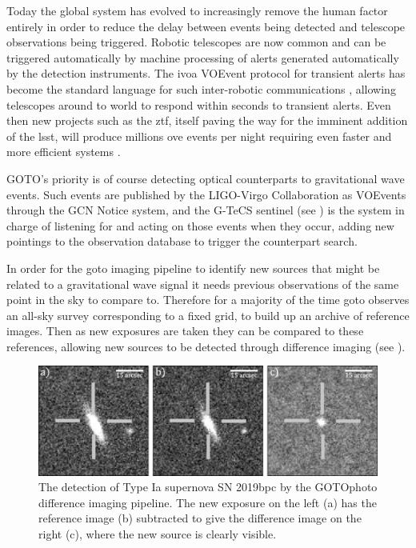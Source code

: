 \begin{colsection}
\begin{colsection}
Today the global system has evolved to increasingly remove the human factor entirely in order to reduce the delay between events being detected and telescope observations being triggered. Robotic telescopes are now common and can be triggered automatically by machine processing of alerts generated automatically by the detection instruments. The \gls{ivoa} VOEvent protocol for transient alerts has become the standard language for such inter-robotic communications \citep{voevent}, allowing telescopes around to world to respond within seconds to transient alerts. Even then new projects such as the \gls{ztf}, itself paving the way for the imminent addition of the \gls{lsst}, will produce millions ove events per night requiring even faster and more efficient systems \citep{ZTF_alerts}.

GOTO's priority is of course detecting optical counterparts to gravitational wave events. Such events are published by the LIGO-Virgo Collaboration as VOEvents through the GCN Notice system, and the G-TeCS sentinel (see ) is the system in charge of listening for and acting on those events when they occur, adding new pointings to the observation database to trigger the counterpart search.

In order for the \gls{goto} imaging pipeline to identify new sources that might be related to a gravitational wave signal it needs previous observations of the same point in the sky to compare to. Therefore for a majority of the time \gls{goto} observes an all-sky survey corresponding to a fixed grid, to build up an archive of reference images. Then as new exposures are taken they can be compared to these references, allowing new sources to be detected through difference imaging (see ).


\begin{figure}[t]
\includegraphics[width=\linewidth]{images/diffimg.pdf}
\caption[The detection of SN 2019bpc through difference imaging]{The detection of Type Ia supernova SN 2019bpc by the GOTOphoto difference imaging pipeline. The new exposure on the left (a) has the reference image (b) subtracted to give the difference image on the right (c), where the new source is clearly visible.}
\label{fig:difference_imaging}
\end{figure}


\end{colsection}


\end{colsection}

